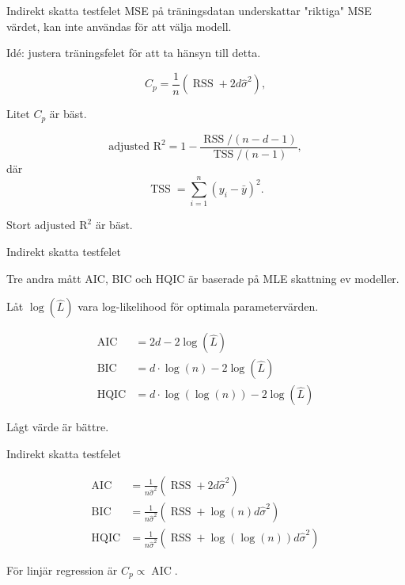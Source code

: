 \documentclass[10pt,english]{beamer}
\begin{document}
\begin{frame}{Indirekt skatta testfelet}
    MSE på träningsdatan underskattar "riktiga" MSE värdet, kan inte användas för att välja modell.

    Idé: justera träningsfelet för att ta hänsyn till detta. 

    \begin{equation*}
        C_p = \frac{1}{n} (\operatorname{RSS} + 2 d \hat{\sigma}^2),
    \end{equation*}

    Litet $C_p$ är bäst.

    \begin{equation*}
        \text{adjusted R}^2 = 1 - \frac{\operatorname{RSS}/(n-d-1)}{\operatorname{TSS}/(n-1)},
    \end{equation*}
    där
    \begin{equation*}
        \operatorname{TSS} = \sum_{i=1}^{n}(y_i - \bar{y})^2.
    \end{equation*}

    Stort $\text{adjusted R}^2$ är bäst.
\end{frame}

\begin{frame}{Indirekt skatta testfelet}
    
    Tre andra mått AIC, BIC och HQIC är baserade på MLE skattning ev modeller.

    Låt $\log(\hat{L})$ vara log-likelihood för optimala parametervärden.

    \begin{align*}
        \operatorname{AIC} &= 2 d - 2 \log(\hat{L}) \\
        \operatorname{BIC} &= d \cdot \log(n) - 2 \log(\hat{L}) \\
        \operatorname{HQIC} &= d \cdot \log(\log(n)) - 2 \log(\hat{L}) 
    \end{align*}

    Lågt värde är bättre.

\end{frame}

\begin{frame}{Indirekt skatta testfelet}
    

    \begin{align*}
        \operatorname{AIC} &= \frac{1}{n \hat{\sigma}^2} (\operatorname{RSS} + 2 d \hat{\sigma}^2) \\
        \operatorname{BIC} &= \frac{1}{n \hat{\sigma}^2} (\operatorname{RSS} + \log(n) d \hat{\sigma}^2) \\
        \operatorname{HQIC} &= \frac{1}{n \hat{\sigma}^2} (\operatorname{RSS} + \log(\log(n)) d \hat{\sigma}^2)
    \end{align*}

    För linjär regression är $C_p \propto \operatorname{AIC}$.

\end{frame}
\end{document}
